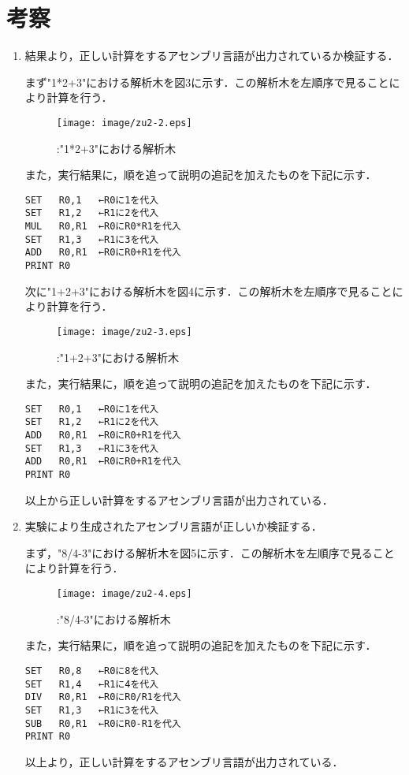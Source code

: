 \documentclass[a4j]{jsarticle}  %
\begin{document}
\section{考察}
\begin{enumerate}
\item 結果より，正しい計算をするアセンブリ言語が出力されているか検証する．

まず"1*2+3"における解析木を図3に示す．この解析木を左順序で見ることにより計算を行う．

\begin{figure}[htbp]
\centering\texttt{[image: image/zu2-2.eps]}
\caption{:"1*2+3"における解析木}
\end{figure}

また，実行結果に，順を追って説明の追記を加えたものを下記に示す．
\begin{verbatim}
SET   R0,1   ←R0に1を代入
SET   R1,2   ←R1に2を代入
MUL   R0,R1  ←R0にR0*R1を代入
SET   R1,3   ←R1に3を代入
ADD   R0,R1  ←R0にR0+R1を代入
PRINT R0
\end{verbatim}

次に"1+2+3"における解析木を図4に示す．この解析木を左順序で見ることにより計算を行う．

\begin{figure}[htbp]
\centering\texttt{[image: image/zu2-3.eps]}
\caption{:"1+2+3"における解析木}
\end{figure}

また，実行結果に，順を追って説明の追記を加えたものを下記に示す．

\begin{verbatim}
SET   R0,1   ←R0に1を代入
SET   R1,2   ←R1に2を代入
ADD   R0,R1  ←R0にR0+R1を代入
SET   R1,3   ←R1に3を代入
ADD   R0,R1  ←R0にR0+R1を代入
PRINT R0
\end{verbatim}

以上から正しい計算をするアセンブリ言語が出力されている．

\item 実験により生成されたアセンブリ言語が正しいか検証する．

まず，"8/4-3"における解析木を図5に示す．この解析木を左順序で見ることにより計算を行う．

\begin{figure}[htbp]
\centering\texttt{[image: image/zu2-4.eps]}
\caption{:"8/4-3"における解析木}
\end{figure}

また，実行結果に，順を追って説明の追記を加えたものを下記に示す．

\begin{verbatim}
SET   R0,8   ←R0に8を代入
SET   R1,4   ←R1に4を代入
DIV   R0,R1  ←R0にR0/R1を代入
SET   R1,3   ←R1に3を代入
SUB   R0,R1  ←R0にR0-R1を代入
PRINT R0
\end{verbatim}

以上より，正しい計算をするアセンブリ言語が出力されている．

\end{enumerate}
\end{document}
